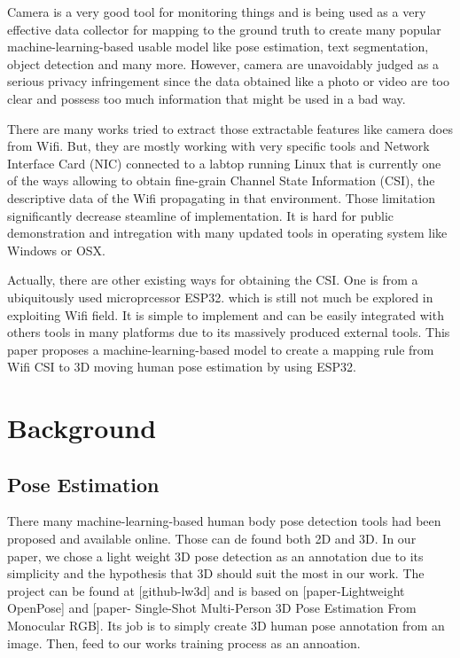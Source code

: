 \documentclass[conference]{IEEEtran}
\begin{document}
		 Camera is a very good tool for monitoring things and is being used as a very effective data collector for mapping to the ground truth to create many popular machine-learning-based usable model like pose estimation, text segmentation, object detection and many  more. However, camera are unavoidably judged as a serious privacy infringement since the data obtained like a photo or video are too clear and possess too much information that might be used in a bad way.
		 
		 There are many works tried to extract those extractable features like camera does from Wifi. But, they are mostly working with very specific tools and Network Interface Card (NIC) connected to a labtop running Linux that is currently one of the ways allowing to obtain fine-grain Channel State Information (CSI), the descriptive data of the  Wifi propagating in that environment. Those limitation significantly decrease steamline of implementation. It is hard for public demonstration and intregation with many updated tools in operating system like Windows or OSX.
		
		Actually, there are other existing ways for obtaining the CSI. One is from a ubiquitously used microprcessor ESP32. which is still not much be explored in exploiting Wifi field. It is simple to implement and can be easily integrated with others tools in many platforms due to its massively produced external tools. This paper proposes a machine-learning-based model to create a mapping rule from Wifi CSI to 3D moving human pose estimation by using ESP32.
	
	
	\section{Background}
	
	\subsection{Pose Estimation}
	
	There many machine-learning-based human body pose detection tools had been proposed and available online. Those can de found both 2D and 3D. In our paper, we chose a light weight 3D pose detection as an annotation due to its simplicity and the hypothesis that 3D should suit the most in our work. The project can be found at [github-lw3d] and is based on [paper-Lightweight OpenPose] and [paper- Single-Shot Multi-Person 3D Pose Estimation From Monocular RGB]. Its job is to simply create 3D human pose annotation from an image. Then, feed to our works training process as an annoation.
	
\end{document}
